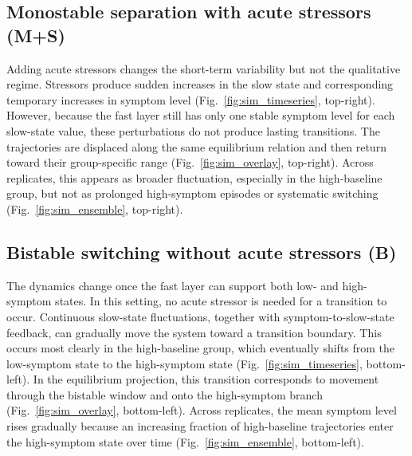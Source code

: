 \documentclass[man,12pt,floatsintext]{apa7}
\begin{document}
\subsection{Monostable separation with acute stressors (M+S)}\label{sec:res_MS}
Adding acute stressors changes the short-term variability but not the qualitative regime. Stressors produce sudden increases in the slow state and corresponding temporary increases in symptom level (Fig.~\ref{fig:sim_timeseries}, top-right). However, because the fast layer still has only one stable symptom level for each slow-state value, these perturbations do not produce lasting transitions. The trajectories are displaced along the same equilibrium relation and then return toward their group-specific range (Fig.~\ref{fig:sim_overlay}, top-right). Across replicates, this appears as broader fluctuation, especially in the high-baseline group, but not as prolonged high-symptom episodes or systematic switching (Fig.~\ref{fig:sim_ensemble}, top-right).
\subsection{Bistable switching without acute stressors (B)}\label{sec:res_B}
The dynamics change once the fast layer can support both low- and high-symptom states. In this setting, no acute stressor is needed for a transition to occur. Continuous slow-state fluctuations, together with symptom-to-slow-state feedback, can gradually move the system toward a transition boundary. This occurs most clearly in the high-baseline group, which eventually shifts from the low-symptom state to the high-symptom state (Fig.~\ref{fig:sim_timeseries}, bottom-left). In the equilibrium projection, this transition corresponds to movement through the bistable window and onto the high-symptom branch (Fig.~\ref{fig:sim_overlay}, bottom-left). Across replicates, the mean symptom level rises gradually because an increasing fraction of high-baseline trajectories enter the high-symptom state over time (Fig.~\ref{fig:sim_ensemble}, bottom-left).
\end{document}

